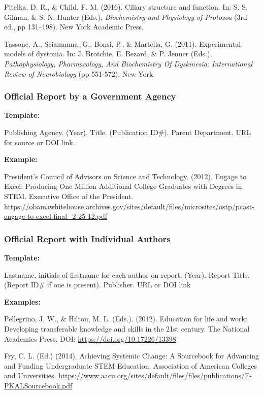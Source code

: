 \documentclass[
]{book}
\begin{document}
Pitelka, D. R., \& Child, F. M. (2016). Ciliary structure and function. In: S. S. Gilman, \& S. N. Hunter (Eds.), \emph{Biochemistry and Physiology of Protozoa} (3rd ed., pp 131--198). New York Academic Press.

Tassone, A., Sciamanna, G., Bonsi, P., \& Martella, G. (2011). Experimental models of dystonia. In: J. Brotchie, E. Bezard, \& P. Jenner (Eds.), \emph{Pathophysiology, Pharmacology, And Biochemistry Of Dyskinesia: International Review of Neurobiology} (pp 551-572). New York.

\hypertarget{official-report-by-a-government-agency}{%
\subsubsection{Official Report by a Government Agency}\label{official-report-by-a-government-agency}}

\textbf{Template:}

Publishing Agency. (Year). Title. (Publication ID\#). Parent Department. URL for source or DOI link.

\textbf{Example:}

President's Council of Advisors on Science and Technology. (2012). Engage to Excel: Producing One Million Additional College Graduates with Degrees in STEM. Executive Office of the President. \url{https://obamawhitehouse.archives.gov/sites/default/files/microsites/ostp/pcast-engage-to-excel-final_2-25-12.pdf}

\hypertarget{official-report-with-individual-authors}{%
\subsubsection{Official Report with Individual Authors}\label{official-report-with-individual-authors}}

\textbf{Template:}

Lastname, initials of firstname for each author on report. (Year). Report Title. (Report ID\# if one is present). Publisher. URL or DOI link

\textbf{Examples:}

Pellegrino, J. W., \& Hilton, M. L. (Eds.). (2012). Education for life and work: Developing transferable knowledge and skills in the 21st century. The National Academies Press. DOI: \url{https://doi.org/10.17226/13398}

Fry, C. L. (Ed.) (2014). Achieving Systemic Change: A Sourcebook for Advancing and Funding Undergraduate STEM Education. Association of American Colleges and Universities. \url{https://www.aacu.org/sites/default/files/files/publications/E-PKALSourcebook.pdf}
\end{document}
